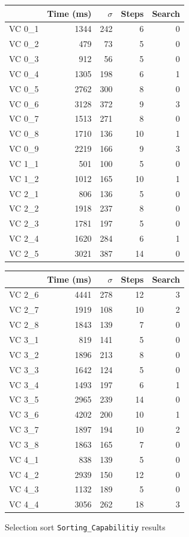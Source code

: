 \begin{figure}[!h]
	\centering
	\begin{tabular}{lrrrr}
		\toprule
			& Time (ms)	& $\sigma$& Steps & Search \\
		\midrule
		VC 0\_1	& 1344		& 242 	& 6 	& 0     \\
		VC 0\_2	& 479		& 73	& 5 	& 0     \\
		VC 0\_3	& 912		& 56	& 5 	& 0     \\
		VC 0\_4	& 1305		& 198	& 6 	& 1     \\
		VC 0\_5	& 2762		& 300	& 8	& 0     \\
		VC 0\_6	& 3128		& 372	& 9 	& 3     \\
		VC 0\_7	& 1513		& 271	& 8 	& 0     \\
		VC 0\_8	& 1710		& 136	& 10	& 1     \\
		VC 0\_9	& 2219		& 166	& 9 	& 3     \\
		VC 1\_1	& 501 		& 100	& 5 	& 0     \\
		VC 1\_2	& 1012 		& 165	& 10	& 1     \\
		VC 2\_1	& 806 		& 136	& 5 	& 0     \\
		VC 2\_2	& 1918		& 237	& 8 	& 0     \\
		VC 2\_3	& 1781		& 197	& 5 	& 0     \\
		VC 2\_4	& 1620		& 284	& 6 	& 1     \\
		VC 2\_5	& 3021		& 387	& 14	& 0     \\
		\bottomrule
	\end{tabular}
	\qquad
	\begin{tabular}{lrrrr}
		\toprule
			& Time (ms)	& $\sigma$& Steps & Search \\
		\midrule
		VC 2\_6	& 4441		& 278	& 12	& 3     \\
		VC 2\_7	& 1919		& 108	& 10	& 2     \\
		VC 2\_8	& 1843		& 139	& 7 	& 0     \\
		VC 3\_1	& 819 		& 141	& 5 	& 0     \\
		VC 3\_2	& 1896		& 213	& 8 	& 0     \\
		VC 3\_3	& 1642		& 124	& 5 	& 0     \\
		VC 3\_4	& 1493		& 197	& 6 	& 1     \\
		VC 3\_5	& 2965		& 239	& 14	& 0     \\
		VC 3\_6	& 4202		& 200	& 10	& 1     \\
		VC 3\_7	& 1897		& 194	& 10	& 2     \\
		VC 3\_8	& 1863		& 165	& 7 	& 0     \\
		VC 4\_1	& 838 		& 139	& 5 	& 0     \\
		VC 4\_2	& 2939		& 150	& 12	& 0     \\
		VC 4\_3	& 1132		& 189	& 5 	& 0     \\
		VC 4\_4	& 3056		& 262	& 18	& 3     \\
		\bottomrule
	\end{tabular}
	\caption{Selection sort \texttt{Sorting\_Capabilitiy} results\label{fig:sortingResults}}
\end{figure}

